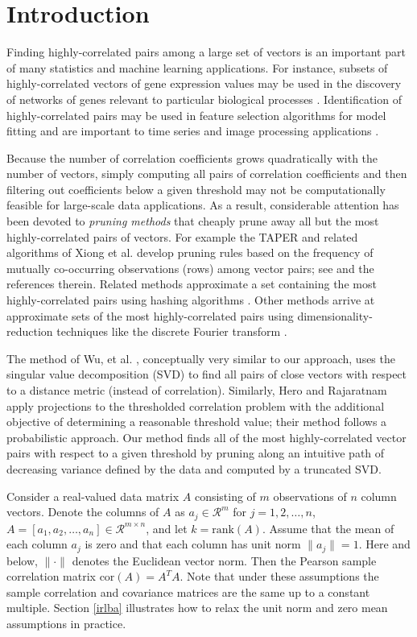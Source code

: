 \documentclass{article}
\numberwithin{algorithmctr}{section}
\begin{document}
\section{Introduction}\label{intro}

Finding highly-correlated pairs among a large set of vectors is an important part 
of many statistics and machine learning applications. For instance, subsets of 
highly-correlated vectors of gene expression values may be used in the discovery 
of networks of genes relevant to particular biological processes \cite{genomics}. 
Identification of highly-correlated pairs may be used in feature selection 
algorithms for model fitting \cite{ml1, ml2} and are important to time series and 
image processing applications \cite{timeseries, svd-similarity}.

Because the number of correlation coefficients grows quadratically with the 
number of vectors, simply computing all pairs of correlation coefficients and 
then filtering out coefficients below a given threshold may not be 
computationally feasible for large-scale data applications. As a result, 
considerable attention has been devoted to \emph{pruning methods} that cheaply 
prune away all but the most highly-correlated pairs of vectors.  For example the 
TAPER and related algorithms of Xiong et al. develop pruning rules based on the 
frequency of mutually co-occurring observations (rows) among vector pairs; see 
\cite{prune1, prune2} and the references therein.  Related methods approximate a 
set containing the most highly-correlated pairs using hashing algorithms 
\cite{prune3}. Other methods arrive at approximate sets of the most 
highly-correlated pairs using dimensionality-reduction techniques like the 
discrete Fourier transform \cite{timeseries}. 

The method of Wu, et al. \cite{svd-similarity}, conceptually very similar to our 
approach, uses the singular value decomposition (SVD) to find all pairs of close 
vectors with respect to a distance metric (instead of correlation). Similarly, 
Hero and Rajaratnam\cite{hero2011large} apply projections to the thresholded 
correlation problem with the additional objective of determining a reasonable 
threshold value; their method follows a probabilistic approach.  Our method finds 
all of the most highly-correlated vector pairs with respect to a given threshold 
by pruning along an intuitive path of decreasing variance defined by the data and
computed by a truncated SVD.

Consider a real-valued data matrix $A$ consisting of $m$ observations of $n$
column vectors.  Denote the columns of $A$ as $a_j\in\mathcal{R}^m$ for
$j=1,2,\ldots,n$, $A=[a_1, a_2, \ldots, a_n]\in\mathcal{R}^{m\times n}$, and
let $k=\mathrm{rank}(A)$.  Assume that the mean of each column $a_j$ is zero
and that each column has unit norm $\|a_j\| = 1$. Here and below, $\|\cdot\|$
denotes the Euclidean vector norm. Then the Pearson sample correlation matrix
$\mathrm{cor}(A)=A^TA$.  Note that under these assumptions the sample
correlation and covariance matrices are the same up to a constant multiple.
Section \ref{irlba} illustrates how to relax the unit norm and zero mean
assumptions in practice.
\end{document}
